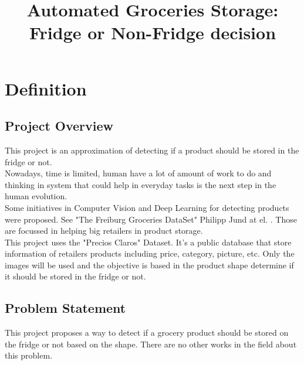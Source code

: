 \documentclass[a4paper,10pt]{article}
\title{Automated Groceries Storage: Fridge or Non-Fridge decision}
\begin{document}
\maketitle 

\section{Definition}

\subsection{Project Overview}


This project is an approximation of detecting if a product should be stored in the fridge or not. \\

Nowadays, time is limited, human have a lot of amount of work to do and thinking in system that could help in everyday tasks is the next step in the human evolution.\\

Some initiatives in Computer Vision and Deep Learning for detecting products were proposed. See "The Freiburg Groceries DataSet" Philipp Jund at el. \cite{freiburgpaper} . Those are focussed in helping big retailers in product storage. \\

This project uses the "Precios Claros" Dataset. It's a public database that store information of retailers products including price, category, picture, etc. Only the images will be used and the objective is based in the product shape determine if it should be stored in the fridge or not.\\


\subsection{Problem Statement}

This project proposes a way to detect if a grocery product should be stored on the fridge or not based on the shape. There are no other works in the field about this problem.\\ 
\end{document}
